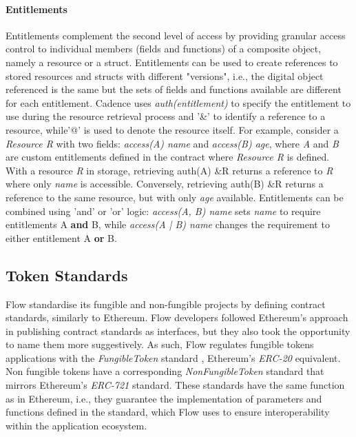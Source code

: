 \documentclass[../NFTComp_IEEE.tex]{subfiles}
\begin{document}
\paragraph{Entitlements}
Entitlements complement the second level of access by providing granular access control to individual members (fields and functions) of a composite object, namely a resource or a struct. Entitlements can be used to create references to stored resources and structs with different "versions", i.e., the digital object referenced is the same but the sets of fields and functions available are different for each entitlement. Cadence uses \textit{auth(entitlement)} to specify the entitlement to use during the resource retrieval process and '\&' to identify a reference to a resource, while'@' is used to denote the resource itself. For example, consider a \textit{Resource R} with two fields: \textit{access(A) name} and \textit{access(B) age}, where \textit{A} and \textit{B} are custom entitlements defined in the contract where \textit{Resource R} is defined. With a resource \textit{R} in storage, retrieving auth(A) \&R returns a reference to \textit{R} where only \textit{name} is accessible. Conversely, retrieving auth(B) \&R returns a reference to the same resource, but with only \textit{age} available. Entitlements can be combined using 'and' or 'or' logic: \textit{access(A, B) name} sets \textit{name} to require entitlements A \textbf{and} B, while \textit{access(A | B) name} changes the requirement to either entitlement A \textbf{or} B.

\subsection{Token Standards}
Flow standardise its fungible and non-fungible projects by defining contract standards, similarly to Ethereum. Flow developers followed Ethereum's approach in publishing contract standards as interfaces, but they also took the opportunity to name them more suggestively. As such, Flow regulates fungible tokens applications with the \textit{FungibleToken} standard \cite{Dapper2022c}, Ethereum's \textit{ERC-20} equivalent. Non fungible tokens have a corresponding \textit{NonFungibleToken} standard \cite{Dapper2022d} that mirrors Ethereum's \textit{ERC-721} standard. These standards have the same function as in Ethereum, i.e., they guarantee the implementation of parameters and functions defined in the standard, which Flow uses to ensure interoperability within the application ecosystem.
\end{document}
